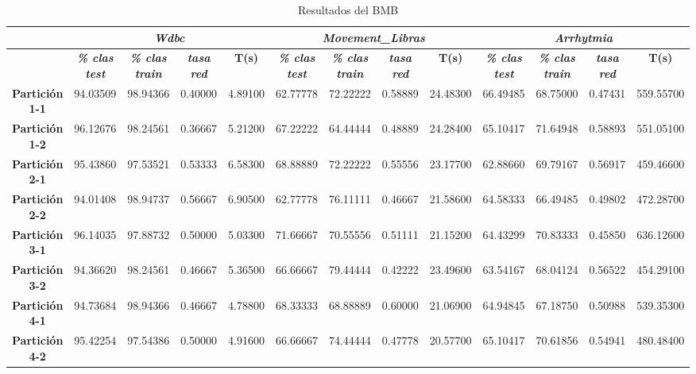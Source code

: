 \documentclass[a4paper,11pt]{article}
\begin{document}
  \begin{table}[H]
  \caption{Resultados del BMB}
  \begin{adjustbox}{width=1.1\textwidth}
  \begin{tabular}{|c|r|r|r|r|r|r|r|r|r|r|r|r|}
  \hline
  \multicolumn{1}{|l|}{} & \multicolumn{ 4}{c|}{\textbf{\textit{Wdbc}}} & \multicolumn{ 4}{c|}{\textbf{\textit{Movement\_Libras}}} & \multicolumn{ 4}{c|}{\textbf{\textit{Arrhytmia}}} \\ \hline
  \multicolumn{1}{|l|}{} & \multicolumn{1}{c|}{\textbf{\textit{\% clas test}}} & \multicolumn{1}{c|}{\textbf{\textit{\% clas train}}} & \multicolumn{1}{c|}{\textbf{\textit{tasa red}}} & \multicolumn{1}{c|}{\textbf{T(s)}} & \multicolumn{1}{c|}{\textbf{\textit{\% clas test}}} & \multicolumn{1}{c|}{\textbf{\textit{\% clas train}}} & \multicolumn{1}{c|}{\textbf{\textit{tasa red}}} & \multicolumn{1}{c|}{\textbf{T(s)}} & \multicolumn{1}{c|}{\textbf{\textit{\% clas test}}} & \multicolumn{1}{c|}{\textbf{\textit{\% clas train}}} & \multicolumn{1}{c|}{\textbf{\textit{tasa red}}} & \multicolumn{1}{c|}{\textbf{T(s)}} \\ \hline
  \textbf{Partición 1-1} & 94.03509 & 98.94366 & 0.40000 & 4.89100 & 62.77778 & 72.22222 & 0.58889 & 24.48300 & 66.49485 & 68.75000 & 0.47431 & 559.55700 \\ \hline
  \textbf{Partición 1-2} & 96.12676 & 98.24561 & 0.36667 & 5.21200 & 67.22222 & 64.44444 & 0.48889 & 24.28400 & 65.10417 & 71.64948 & 0.58893 & 551.05100 \\ \hline
  \textbf{Partición 2-1} & 95.43860 & 97.53521 & 0.53333 & 6.58300 & 68.88889 & 72.22222 & 0.55556 & 23.17700 & 62.88660 & 69.79167 & 0.56917 & 459.46600 \\ \hline
  \textbf{Partición 2-2} & 94.01408 & 98.94737 & 0.56667 & 6.90500 & 62.77778 & 76.11111 & 0.46667 & 21.58600 & 64.58333 & 66.49485 & 0.49802 & 472.28700 \\ \hline
  \textbf{Partición 3-1} & 96.14035 & 97.88732 & 0.50000 & 5.03300 & 71.66667 & 70.55556 & 0.51111 & 21.15200 & 64.43299 & 70.83333 & 0.45850 & 636.12600 \\ \hline
  \textbf{Partición 3-2} & 94.36620 & 98.24561 & 0.46667 & 5.36500 & 66.66667 & 79.44444 & 0.42222 & 23.49600 & 63.54167 & 68.04124 & 0.56522 & 454.29100 \\ \hline
  \textbf{Partición 4-1} & 94.73684 & 98.94366 & 0.46667 & 4.78800 & 68.33333 & 68.88889 & 0.60000 & 21.06900 & 64.94845 & 67.18750 & 0.50988 & 539.35300 \\ \hline
  \textbf{Partición 4-2} & 95.42254 & 97.54386 & 0.50000 & 4.91600 & 66.66667 & 74.44444 & 0.47778 & 20.57700 & 65.10417 & 70.61856 & 0.54941 & 480.48400 \\ \hline

\end{tabular}
\end{adjustbox}
\end{table}
\end{document}
